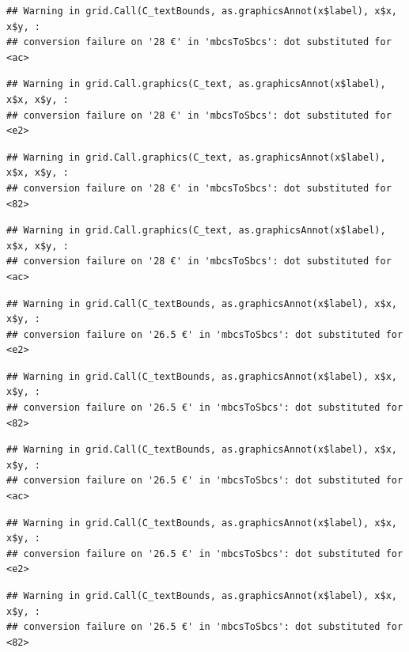 \documentclass[
]{article}
\begin{document}
\begin{verbatim}
## Warning in grid.Call(C_textBounds, as.graphicsAnnot(x$label), x$x, x$y, :
## conversion failure on '28 €' in 'mbcsToSbcs': dot substituted for <ac>
\end{verbatim}

\begin{verbatim}
## Warning in grid.Call.graphics(C_text, as.graphicsAnnot(x$label), x$x, x$y, :
## conversion failure on '28 €' in 'mbcsToSbcs': dot substituted for <e2>
\end{verbatim}

\begin{verbatim}
## Warning in grid.Call.graphics(C_text, as.graphicsAnnot(x$label), x$x, x$y, :
## conversion failure on '28 €' in 'mbcsToSbcs': dot substituted for <82>
\end{verbatim}

\begin{verbatim}
## Warning in grid.Call.graphics(C_text, as.graphicsAnnot(x$label), x$x, x$y, :
## conversion failure on '28 €' in 'mbcsToSbcs': dot substituted for <ac>
\end{verbatim}

\begin{verbatim}
## Warning in grid.Call(C_textBounds, as.graphicsAnnot(x$label), x$x, x$y, :
## conversion failure on '26.5 €' in 'mbcsToSbcs': dot substituted for <e2>
\end{verbatim}

\begin{verbatim}
## Warning in grid.Call(C_textBounds, as.graphicsAnnot(x$label), x$x, x$y, :
## conversion failure on '26.5 €' in 'mbcsToSbcs': dot substituted for <82>
\end{verbatim}

\begin{verbatim}
## Warning in grid.Call(C_textBounds, as.graphicsAnnot(x$label), x$x, x$y, :
## conversion failure on '26.5 €' in 'mbcsToSbcs': dot substituted for <ac>
\end{verbatim}

\begin{verbatim}
## Warning in grid.Call(C_textBounds, as.graphicsAnnot(x$label), x$x, x$y, :
## conversion failure on '26.5 €' in 'mbcsToSbcs': dot substituted for <e2>
\end{verbatim}

\begin{verbatim}
## Warning in grid.Call(C_textBounds, as.graphicsAnnot(x$label), x$x, x$y, :
## conversion failure on '26.5 €' in 'mbcsToSbcs': dot substituted for <82>
\end{verbatim}
\end{document}
